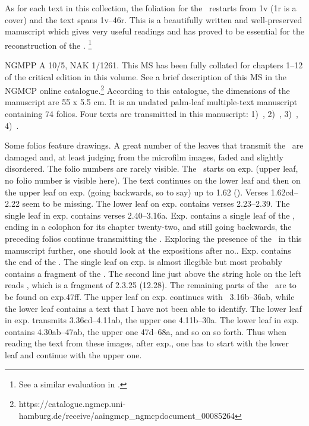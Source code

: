 As for each text in this collection, the foliation for the
\VSS\ restarts from \fol1v (\fol1r is a cover) and the text
spans \fols1v--46r. This is a beautifully written and well-preserved
manuscript which gives very useful readings and has proved to be
essential for the reconstruction of the \VSS.%
	\footnote{See a similar evaluation in
					.}


NGMPP A 10/5, NAK 1/1261. This MS has been fully collated 
for chapters 1--12 of the critical edition in this volume. 
See a brief description of this MS in
the NGMCP online catalogue.\footnote{https://catalogue.ngmcp.uni-hamburg.de/receive/aaingmcp\_ngmcpdocument\_00085264}
According to this catalogue, the dimensions of the manuscript are 55 x
5.5 cm. It is an undated palm-leaf multiple-text manuscript containing 74
folios. Four texts are transmitted in this manuscript: 
1)~\SDhU,
2)~\Ums,
3)~\SivaUp,
4)~\Vss.

Some folios feature drawings. 
A great number of the leaves that 
transmit the \VSS\ are damaged and, 
at least judging from the microfilm images, 
faded and slightly disordered. The folio numbers are
rarely visible. The \VSS\ starts on exp. 
(upper leaf, no folio number is visible here). 
The text continues on the lower leaf and then on the upper
leaf on exp. (going backwards, so to say) 
up to 1.62 (). 
Verses 1.62cd--2.22 seem to be missing. The lower leaf on
exp. contains verses 2.23--2.39. 
The single leaf in exp. contains
verses 2.40--3.16a. Exp. contains a single leaf of the
, ending in a colophon for its chapter
twenty-two, and still going backwards, the preceding folios continue
transmitting the 
\Ums. 
Exploring the presence of
the \VSS\ in this manuscript further, 
one should look at the expositions
after no.. Exp. contains the end of the
\SivaUp. The
single leaf on exp. 
is almost illegible but most probably contains a
fragment of the 
. 
The second line just above
the string hole on the left reads  , which is a fragment of
2.3.25 (12.28). 
The remaining parts of the \VSS\
are to be found on exp.ff. 
The upper leaf on exp.\thinspace47 continues with
\VSS\ 3.16b--36ab, while the lower leaf contains a text that I have not
been able to identify. The lower leaf in exp.\thinspace48 transmits
3.36cd--4.11ab, the upper one 4.11b--30a. The lower leaf in 
exp. contains 4.30ab--47ab, 
the upper one 47d--68a, and so on so forth. Thus
when reading the text from these images, after exp., 
one has to start with the lower leaf and continue with the upper one.


